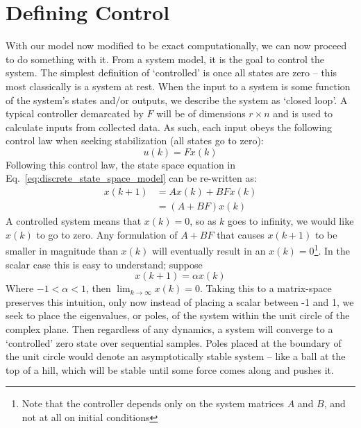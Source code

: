 \FloatBarrier\section{Defining Control} %
With our model now modified to be exact computationally, we can now proceed to do something with it. From a system model, it is the goal to control the system. The simplest definition of `controlled' is once all states are zero -- this most classically is a system at rest. When the input to a system is some function of the system's states and/or outputs, we describe the system as `closed loop'. A typical controller demarcated by $F$ will be of dimensions $r\times n$ and is used to calculate inputs from collected data. As such, each input obeys the following control law when seeking stabilization (all states go to zero):
\begin{equation}
    u(k) = Fx(k)
    \label{eq:control_law}
\end{equation}
Following this control law, the state space equation in Eq.~\ref{eq:discrete_state_space_model} can be re-written as:
\begin{align}
    x(k+1)&=Ax(k)+BFx(k) \\
    &=(A+BF)x(k)
    \label{eq:A_BF_state_space}
\end{align}
A controlled system means that $x\left(k\right)=0$, so as $k$ goes to infinity, we would like $x\left(k\right)$ to go to zero. Any formulation of $A+BF$ that causes $x\left(k+1\right)$ to be smaller in magnitude than $x\left(k\right)$ will eventually result in an $x\left(k\right)=0$\footnote{Note that the controller depends only on the system matrices $A$ and $B$, and not at all on initial conditions}. In the scalar case this is easy to understand; suppose
\begin{equation}
    x(k+1)=\alpha x(k)
    \label{eq:scalar_control}
\end{equation}
Where $-1 < \alpha < 1$, then $\lim_{k \to \infty}{x(k) = 0}$. Taking this to a matrix-space preserves this intuition, only now instead of placing a scalar between -1 and 1, we seek to place the eigenvalues, or poles, of the system within the unit circle of the complex plane. Then regardless of any dynamics, a system will converge to a `controlled' zero state over sequential samples. Poles placed at the boundary of the unit circle would denote an asymptotically stable system -- like a ball at the top of a hill, which will be stable until some force comes along and pushes it.

